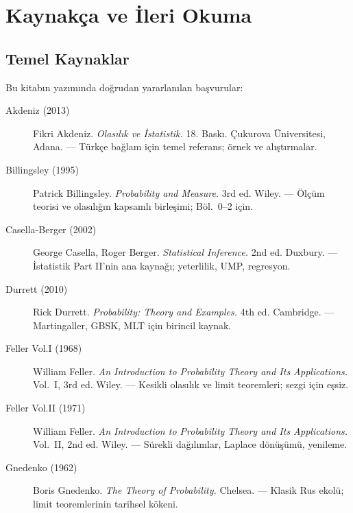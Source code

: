 \chapter{Kaynakça ve İleri Okuma}
\label{app:kaynaklar}

\section{Temel Kaynaklar}

Bu kitabın yazımında doğrudan yararlanılan başvurular:

\begin{description}
  \item[Akdeniz (2013)] Fikri Akdeniz. \textit{Olasılık ve İstatistik.} 18. Baskı. Çukurova Üniversitesi, Adana. — Türkçe bağlam için temel referans; örnek ve alıştırmalar.

  \item[Billingsley (1995)] Patrick Billingsley. \textit{Probability and Measure.} 3rd ed. Wiley. — Ölçüm teorisi ve olasılığın kapsamlı birleşimi; Böl.~0--2 için.

  \item[Casella-Berger (2002)] George Casella, Roger Berger. \textit{Statistical Inference.} 2nd ed. Duxbury. — İstatistik Part II'nin ana kaynağı; yeterlilik, UMP, regresyon.

  \item[Durrett (2010)] Rick Durrett. \textit{Probability: Theory and Examples.} 4th ed. Cambridge. — Martingaller, GBSK, MLT için birincil kaynak.

  \item[Feller Vol.I (1968)] William Feller. \textit{An Introduction to Probability Theory and Its Applications.} Vol.~I, 3rd ed. Wiley. — Kesikli olasılık ve limit teoremleri; sezgi için eşsiz.

  \item[Feller Vol.II (1971)] William Feller. \textit{An Introduction to Probability Theory and Its Applications.} Vol.~II, 2nd ed. Wiley. — Sürekli dağılımlar, Laplace dönüşümü, yenileme.

  \item[Gnedenko (1962)] Boris Gnedenko. \textit{The Theory of Probability.} Chelsea. — Klasik Rus ekolü; limit teoremlerinin tarihsel kökeni.


\end{description}
